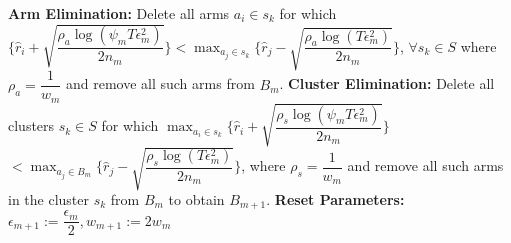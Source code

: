 \begin{algorithm}
\begin{algorithmic}[1]
\State \hspace*{2em} \textbf{Arm Elimination:}
\newline
\hspace*{2em} Delete all arms $a_{i}\in s_{k}$ for which
\newline\hspace*{2em}$\bigg\lbrace\hat{r}_{i} + \sqrt{\dfrac{\rho_{a}\log{(\psi_{m}T\epsilon_{m}^{2})}}{2 n_{m}}} \bigg\rbrace < \max_{a_{j}\in s_{k}}\bigg\lbrace\hat{r}_{j} -\sqrt{\dfrac{\rho_{a}\log{(T\epsilon_{m}^{2})}}{2 n_{m}}} \bigg\rbrace$, $\forall s_{k}\in S$ where $\rho_{a}=\dfrac{1}{w_{m}}$ and remove all such arms from $B_{m}$.
\State \hspace*{2em} \textbf{Cluster Elimination:}
\newline
\hspace*{2em} Delete all clusters $s_{k}\in S$ for which $\max_{a_{i}\in s_{k}}\bigg\lbrace\hat{r}_{i} + \sqrt{\dfrac{\rho_{s}\log{(\psi_{m}T\epsilon_{m}^{2})}}{2 n_{m}}}\bigg\rbrace  $\newline\hspace*{4em}$< \max_{a_{j}\in B_{m}} \bigg\lbrace\hat{r}_{j} - \sqrt{\dfrac{\rho_{s} \log{(T\epsilon_{m}^{2})}}{2 n_{m}}}\bigg\rbrace$, where $\rho_{s}=\dfrac{1}{w_{m}}$ and remove all such arms in the cluster $s_{k}$ from $B_{m}$ to obtain $B_{m+1}$.
\State \hspace*{2em} \textbf{Reset Parameters:}
\newline \hspace*{2em} $\epsilon_{m+1}:=\dfrac{\epsilon_{m}}{2},w_{m+1}:=2w_{m}$

\end{algorithmic}
\end{algorithm}
